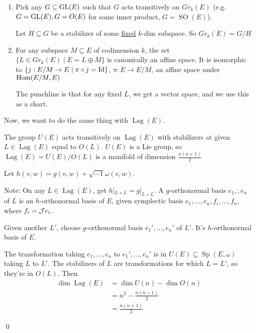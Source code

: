 \documentclass[x11names,reqno,14pt]{extarticle}
\DeclareMathOperator{\SO}{SO}
\newcommand{\spew}{\Sp(E,\omega)}
\DeclareMathOperator{\Sp}{Sp}
\DeclareMathOperator{\Lag}{Lag}
\begin{document}
\begin{enumerate}[label=(\roman*)]

\item Pick any $G \subseteq {\mathrm{GL}}(E)$ such that $G$ acts transitively on $Gr_k(E)$ (e.g. $G = {\mathrm{GL}}(E), G = O(E)$ for some inner product, $G = \SO(E)$). 

Let $H \subseteq G$ be a stabilizer of some \underline{fixed} $k$-dim subspace. So $Gr_k(E) = G/H$

\item For any subspace $M \subseteq E$ of codimension $k$, the set  $\{L \in Gr_k(E) \mid E = L \oplus M \}$ is canonically an affine space. It is isomorphic to $\{j:E/M\to E \mid \pi\circ j = \operatorname{\mathrm{Id}}\}$, $\pi: E\to E/M$, an affine space under ${\mathrm{Hom}}(E/M,E)$

The punchline is that for any fixed $L$, we get a vector space, and we use this as a chart. 


\end{enumerate}



Now, we want to do the same thing with $\Lag(E)$. 

\prop

The group $U(E)$ acts transitively on $\Lag(E)$ with stabilizers at given $L \in \Lag(E)$ equal to $O(L)$. $U(E)$ is a Lie group, so $\Lag(E) = U(E)/O(L)$ is a manifold of dimension $\frac{n(n+1)}{2}$

\proof

Let $h(v, w) = g(v, w) + \sqrt{-1}\omega(v,w)$. 

Note: On any $L \in \Lag(E)$, get $h|_{L\times L} = g|_{L\times L}$. A $g$-orthonormal basis $e_1, \dot, e_n$ of $L$ is an $h$-orthonormal basis of $E$, given symplectic basis $e_1, \dots, e_n, f_i, \dots, f_n$, where $f_i = \mathcal{J}e_i$. 

Given another $L'$, choose $g$-orthonormal basis $e_1',\dots,e_n'$ of $L'$. It's $h$-orthonormal basis of $E$. 

The transformation taking $e_1, \dots, e_n$ to $e_1', \dots, e_n'$ is in $U(E) \subseteq \spew$ taking $L$ to $L'$. The stabilizers of $L$ are transformations for which $L = L'$, so they're in $O(L)$. 
Then
\begin{align*}
\dim\Lag(E) & = \dim U(n) - \dim O(n) \\
& = n^2 - \frac{n(n-1)}{2} \\
&= \frac{n(n+1)}{2}
\end{align*}

\qed
\end{document}
